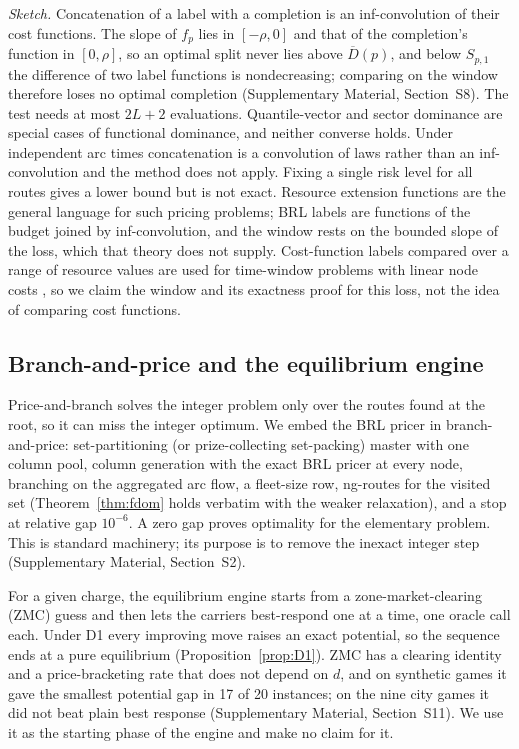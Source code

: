 \documentclass[preprint,11pt]{elsarticle}
\theoremstyle{definition}
\theoremstyle{remark}
\newcommand{\Dh}{\overline{D}}
\newcommand{\SM}[1]{Supplementary Material, Section~#1}
\begin{document}
\emph{Sketch.} Concatenation of a label with a completion is an inf-convolution of their cost functions. The slope of $f_p$ lies in $[-\rho,0]$ and that of the completion's function in $[0,\rho]$, so an optimal split never lies above $\Dh(p)$, and below $S_{p,1}$ the difference of two label functions is nondecreasing; comparing on the window therefore loses no optimal completion (\SM{S8}). The test needs at most $2L+2$ evaluations. Quantile-vector and sector dominance are special cases of functional dominance, and neither converse holds. Under independent arc times concatenation is a convolution of laws rather than an inf-convolution and the method does not apply. Fixing a single risk level for all routes gives a lower bound but is not exact. Resource extension functions \citep{Irnich2008} are the general language for such pricing problems; BRL labels are functions of the budget joined by inf-convolution, and the window rests on the bounded slope of the loss, which that theory does not supply. Cost-function labels compared over a range of resource values are used for time-window problems with linear node costs \citep{Ioachim1998}, so we claim the window and its exactness proof for this loss, not the idea of comparing cost functions.

\subsection{Branch-and-price and the equilibrium engine}\label{sec:bp}\label{sec:engine}

Price-and-branch solves the integer problem only over the routes found at the root, so it can miss the integer optimum. We embed the BRL pricer in branch-and-price: set-partitioning (or prize-collecting set-packing) master with one column pool, column generation with the exact BRL pricer at every node, branching on the aggregated arc flow, a fleet-size row, ng-routes \citep{Baldacci2011} for the visited set (Theorem~\ref{thm:fdom} holds verbatim with the weaker relaxation), and a stop at relative gap $10^{-6}$. A zero gap proves optimality for the elementary problem. This is standard machinery; its purpose is to remove the inexact integer step (\SM{S2}).

For a given charge, the equilibrium engine starts from a zone-market-clearing (ZMC) guess and then lets the carriers best-respond one at a time, one oracle call each. Under D1 every improving move raises an exact potential, so the sequence ends at a pure equilibrium (Proposition~\ref{prop:D1}). ZMC has a clearing identity and a price-bracketing rate that does not depend on $d$, and on synthetic games it gave the smallest potential gap in 17 of 20 instances; on the nine city games it did not beat plain best response (\SM{S11}). We use it as the starting phase of the engine and make no claim for it.
\end{document}
